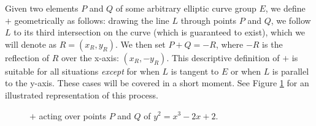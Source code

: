 Given two elements $P$ and $Q$ of some arbitrary elliptic curve group $E$, we define $+$ geometrically as follows: drawing the line $L$ through points $P$ and $Q$, we follow $L$ to its third intersection on the curve (which is guaranteed to exist), which we will denote as $R = (x_R, y_R)$. We then set $P + Q = -R$, where $-R$ is the reflection of $R$ over the x-axis: $(x_R, -y_R)$. This descriptive definition of $+$ is suitable for all situations \emph{except} for when $L$ is tangent to $E$ or when $L$ is parallel to the y-axis. These cases will be covered in a short moment. See Figure \ref{fig:groupop} for an illustrated representation of this process.

\begin{figure}[!h]
\caption{$+$ acting over points $P$ and $Q$ of $y^2 = x^3 - 2x + 2$.}
\label{fig:groupop}
\end{figure}

